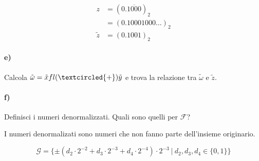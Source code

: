 \begin{equation*}
\begin{split}
  z &= (0.\overline{1000})_2\\
    &= (0.10001000\ldots )_2\\
  \tilde{z} &= (0.1001)_2
\end{split}
\end{equation*}


\paragraph{e)} Calcola $\tilde{\omega}=\tilde{x}fl(\textcircled{+})\tilde{y}$ e trova la relazione tra $\tilde{\omega}$ e $\tilde{z}$.


\paragraph{f)} Definisci i numeri denormalizzati. Quali sono quelli per $\mathcal{F}$?\medskip

I numeri denormalizati sono numeri che non fanno parte dell'insieme originario.

\begin{equation*}
  \mathcal{G} = \{\pm (d_2\cdot 2^{-2} + d_3\cdot 2^{-3} + d_4\cdot 2^{-4})\cdot 2^{-3} ~|~ d_2, d_3, d_4 \in \{0,1\}\}
\end{equation*}



















